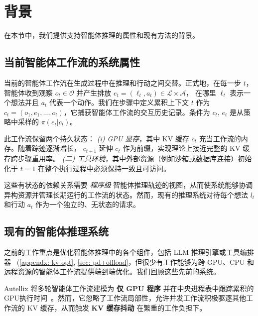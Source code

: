 \vspace{-2mm}
\section{背景}
在本节中，我们提供支持智能体推理的属性和现有方法的背景。
\subsection{当前智能体工作流的系统属性}
\label{sec::react agent system}

当前的智能体工作流在生成过程中在推理和行动之间交替。正式地，在每一步 $t$，智能体收到观察 $o_t \in \mathcal{O}$ 并产生排放 $e_t = (\ell_t, a_t) \in \mathcal{L} \times \mathcal{A}$， 在哪里 $\ell_t$ 表示一个想法并且 $a_t$ 代表一个动作。我们在步骤中定义累积上下文 $t$ 作为 $c_t = (o_1, e_1, \dots, o_t)$，它捕获智能体工作流的交互历史记录。条件为 $c_t$, $e_t$ 是从策略中采样的 $\pi(e_t|c_t)$。

此工作流保留两个持久状态： \textit{(i) GPU 显存}，其中 KV 缓存 $c_t$ 充当工作流的内存。随着踪迹逐渐增长， $c_{t+1}$ 延伸 $c_t$ 作为前缀，实现理论上接近完整的 KV 缓存跨步骤重用率。 \textit{(二) 工具环境}，其中外部资源（例如沙箱或数据库连接）初始化于 $t=1$ \mbox{在整个执行过程中必须保持一致且可访问。}

这些有状态的依赖关系需要 \textit{程序级} 智能体推理轨迹的视图，从而使系统能够协调异构资源并管理长期运行的工作流的状态。然而，现有的推理系统对待每个想法 $l_t$ 和行动 $a_t$ 作为一个独立的、无状态的请求。

\vspace{-2mm}
\subsection{现有的智能体推理系统}

之前的工作重点是优化智能体推理中的各个组件，包括 LLM 推理引擎或工具编排器 ~(\autoref{appendx: kv opt}, \autoref{sec: pd+offload}，但很少有工作能够为跨 GPU、CPU 和远程资源的智能体工作流提供端到端优化。我们回顾这些先前的系统。

Autellix 将多轮智能体工作流建模为 \textbf{仅 GPU 程序} 并在中央进程表中跟踪累积的GPU执行时间~\citep{luo2025autellixefficientservingengine}。然而，它忽略了工作流局部性，允许并发工作流积极驱逐其他工作流的 KV 缓存，从而触发 \textbf{KV 缓存抖动} 在繁重的工作负担下。


